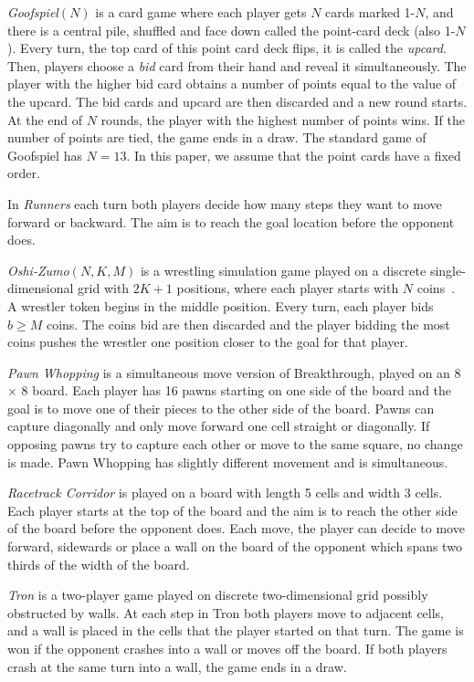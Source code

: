 \documentclass[conference]{IEEEtran}
\begin{document}
\textit{Goofspiel}$(N)$ is a card game where each player gets $N$ cards marked 1-$N$, and there is a central pile, 
shuffled and face down called the point-card deck (also 1-$N$). Every turn, the top card of this point card deck flips, 
it is called the {\it upcard}. Then, players choose a {\it bid} card from their hand and reveal it simultaneously. 
The player with the higher bid card obtains a number of points equal to the value of the upcard. The bid cards and 
upcard are then discarded and a new round starts. At the end of $N$ rounds, the player with the highest number of 
points wins. If the number of points are tied, the game ends in a draw. The standard game of Goofspiel has 
$N = 13$. In this paper, we assume that the point cards have a fixed order. 

In \textit{Runners} each turn both players decide how many steps they want to move forward or backward. The aim 
is to reach the goal location before the opponent does.

\textit{Oshi-Zumo}$(N,K,M)$ is a wrestling simulation game played on a discrete single-dimensional grid with 
$2K+1$ positions, where each player starts with $N$ coins~\cite{Buro03OshiZumo}. A wrestler token begins in the middle 
position. Every turn, 
each player bids $b \ge M$ coins. The coins bid are then discarded and the player bidding the most coins pushes the 
wrestler one position closer to the goal for that player. 

\textit{Pawn Whopping} is a simultaneous move version of Breakthrough, played on an 8 $\times$ 8 board. Each player has 
16 pawns starting on one side of the board and the goal is to move one of their pieces to the other side of the board. 
Pawns can capture diagonally and only move forward one cell straight or diagonally.
If opposing pawns try to capture each other or move to the same square, no change is made. 
Pawn Whopping has slightly different movement and is simultaneous.

\textit{Racetrack Corridor} is played on a board with length 5 cells and width 3 cells. Each player starts at the top of the board and the aim is to reach the other side of the board before the opponent does. Each move, the player can decide to move forward, sidewards or place a wall on the board of the opponent which spans two thirds of the width of the board.

\textit{Tron} is a two-player game played on discrete two-dimensional grid possibly obstructed by walls. At each
step in Tron both players move to adjacent cells, and a wall is placed in the cells that the player started on that turn. 
The game is won if the opponent crashes into a wall or moves off the board. If both players crash at the same turn 
into a wall, the game ends in a draw.
\end{document}
